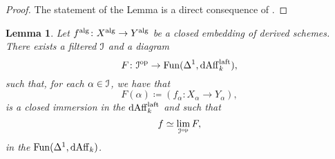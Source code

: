 \documentclass[10pt,a4paper,reqno]{amsart} %
\theoremstyle{plain}
\newtheorem{lem}[thm]{Lemma}
\theoremstyle{definition}
\theoremstyle{remark}
\numberwithin{equation}{section}
\begin{document}
\begin{proof} 
    The statement of the Lemma is a direct consequence of \cite[Theorem 6.12]{Porta_Yu_NQK}.
\end{proof}
%



\begin{lem} \label{lem:Noetherian_approximation_of_nil_isomorphisms}
    Let $f^\mathrm{alg} \colon X^\mathrm{alg} \to Y^\mathrm{alg}$ be a closed embedding of derived schemes. There exists a filtered \infcat $\mathcal I$ and a diagram
        \[
            F \colon \mathcal I ^\mathrm{op} \to \operatorname{Fun}(\Delta^1, \mathrm{dAff}^{\mathrm{laft}}_k),  
        \]
   such that, for each $\alpha \in \mathcal I$, we have that
        \[
            F(\alpha) \coloneqq (f_\alpha \colon X_\alpha \to Y_\alpha),  
        \]
    is a closed immersion in the \infcat $\mathrm{dAff}_k^{\mathrm{laft}}$ and such that
        \[
            f \simeq \lim_{\mathcal I^\mathrm{op}} F,  
       \]
    in the \infcat $\operatorname{Fun}(\Delta^1, \mathrm{dAff}_k)$.
\end{lem}
\end{document}
